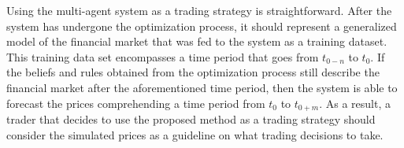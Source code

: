 Using the multi-agent system as a trading strategy is straightforward. After the
system has undergone the optimization process, it should represent a
generalized model of the financial market that was fed to the system as a
training dataset. This training data set encompasses a time period that goes
from $t_{0-n}$ to $t_0$. If the beliefs and rules obtained from the optimization
process still describe the financial market after the aforementioned time
period, then the system is able to forecast the prices comprehending a time
period from $t_0$ to $t_{0+m}$. As a result, a trader that decides to use the
proposed method as a trading strategy should consider the simulated prices as a
guideline on what trading decisions to take.
